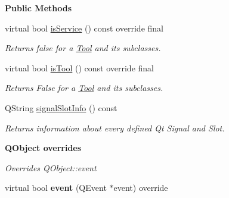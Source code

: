 \begin{Indent}\textbf{ Public Methods}\par
\begin{DoxyCompactItemize}
\item 
\mbox{\label{classrev_1_1_view_1_1_tool_ae9934b9378902dae75af71a63202361c}} 
virtual bool \mbox{\hyperlink{classrev_1_1_view_1_1_tool_ae9934b9378902dae75af71a63202361c}{is\+Service}} () const override final
\begin{DoxyCompactList}\small\item\em Returns false for a \mbox{\hyperlink{classrev_1_1_view_1_1_tool}{Tool}} and its subclasses. \end{DoxyCompactList}\item 
\mbox{\label{classrev_1_1_view_1_1_tool_a92bc67e022a77948feb3a07cb232df1e}} 
virtual bool \mbox{\hyperlink{classrev_1_1_view_1_1_tool_a92bc67e022a77948feb3a07cb232df1e}{is\+Tool}} () const override final
\begin{DoxyCompactList}\small\item\em Returns False for a \mbox{\hyperlink{classrev_1_1_view_1_1_tool}{Tool}} and its subclasses. \end{DoxyCompactList}\item 
\mbox{\label{classrev_1_1_view_1_1_tool_a34494a88168b7811b60b7c3cd2e6c7f8}} 
Q\+String \mbox{\hyperlink{classrev_1_1_view_1_1_tool_a34494a88168b7811b60b7c3cd2e6c7f8}{signal\+Slot\+Info}} () const
\begin{DoxyCompactList}\small\item\em Returns information about every defined Qt Signal and Slot. \end{DoxyCompactList}\end{DoxyCompactItemize}
\end{Indent}
\begin{Indent}\textbf{ Q\+Object overrides}\par
{\em Overrides Q\+Object\+::event }\begin{DoxyCompactItemize}
\item 
\mbox{\label{classrev_1_1_view_1_1_tool_aff8826ba4ecdc82c8273efd2b7d82d6a}} 
virtual bool {\bfseries event} (Q\+Event $\ast$event) override
\end{DoxyCompactItemize}
\end{Indent}
